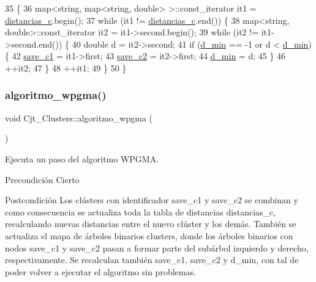 \begin{DoxyCode}
35                                     \{
36   map<string, map<string, double> >::const\_iterator it1 = \hyperlink{class_cjt___clusters_a2b912c7987fd370bdeaf5dabb966240f}{distancias\_c}.begin();
37   \textcolor{keywordflow}{while} (it1 != \hyperlink{class_cjt___clusters_a2b912c7987fd370bdeaf5dabb966240f}{distancias\_c}.end()) \{
38     map<string, double>::const\_iterator it2 = it1->second.begin();
39     \textcolor{keywordflow}{while} (it2 != it1->second.end()) \{
40       \textcolor{keywordtype}{double} d = it2->second;
41       \textcolor{keywordflow}{if} (\hyperlink{class_cjt___clusters_a1b94b5f25778ee95796a9be966f1c619}{d\_min} == -1 or d < \hyperlink{class_cjt___clusters_a1b94b5f25778ee95796a9be966f1c619}{d\_min}) \{
42         \hyperlink{class_cjt___clusters_af010e61859190999fb23f1854f4d23aa}{save\_c1} = it1->first;
43         \hyperlink{class_cjt___clusters_a1406c60345958da0016fa3c0b1cd89f5}{save\_c2} = it2->first;
44         \hyperlink{class_cjt___clusters_a1b94b5f25778ee95796a9be966f1c619}{d\_min} = d;
45       \}
46       ++it2;
47     \}
48     ++it1;
49   \}
50 \}
\end{DoxyCode}
\mbox{\label{class_cjt___clusters_a04cfe3b7b8998398a48459f9a9339c22}} 
\subsubsection{\texorpdfstring{algoritmo\+\_\+wpgma()}{algoritmo\_wpgma()}}
{\footnotesize\ttfamily void Cjt\+\_\+\+Clusters\+::algoritmo\+\_\+wpgma (\begin{DoxyParamCaption}{ }\end{DoxyParamCaption})\hspace{0.3cm}{\ttfamily [private]}}



Ejecuta un paso del algoritmo W\+P\+G\+MA. 

\begin{DoxyPrecond}{Precondición}
Cierto 
\end{DoxyPrecond}
\begin{DoxyPostcond}{Postcondición}
Los clústers con identificador \textquotesingle{}save\+\_\+c1\textquotesingle{} y \textquotesingle{}save\+\_\+c2\textquotesingle{} se combinan y como consecuencia se actualiza toda la tabla de distancias \textquotesingle{}distancias\+\_\+c\textquotesingle{}, recalculando nuevas distancias entre el nuevo clúster y los demás. También se actualiza el mapa de árboles binarios \textquotesingle{}clusters\textquotesingle{}, donde los árboles binarios con nodos \textquotesingle{}save\+\_\+c1\textquotesingle{} y \textquotesingle{}save\+\_\+c2\textquotesingle{} pasan a formar parte del subárbol izquierdo y derecho, respectivamente. Se recalculan también \textquotesingle{}save\+\_\+c1\textquotesingle{}, \textquotesingle{}save\+\_\+c2\textquotesingle{} y \textquotesingle{}d\+\_\+min\textquotesingle{}, con tal de poder volver a ejecutar el algoritmo sin problemas. 
\end{DoxyPostcond}


